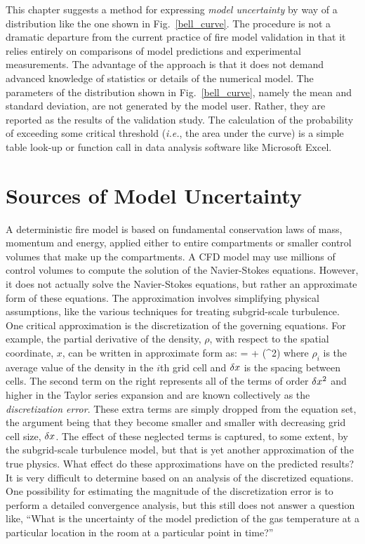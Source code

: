 This chapter suggests a method for expressing {\em model uncertainty} by way of a distribution like the one shown in Fig.~\ref{bell_curve}. The
procedure is not a dramatic departure from the current practice of fire model validation in that it relies entirely on comparisons of model
predictions and experimental measurements. The advantage of the approach is that it does not demand advanced knowledge of statistics or details of
the numerical model. The parameters of the distribution shown in Fig.~\ref{bell_curve}, namely the mean and standard deviation, are not generated by
the model user. Rather, they are reported as the results of the validation study. The calculation of the probability of exceeding some critical
threshold ({\em i.e.}, the area under the curve) is a simple table look-up or function call in data analysis software like Microsoft
Excel\textregistered.



\section{Sources of Model Uncertainty}

A deterministic fire model is based on fundamental conservation laws of mass, momentum and energy,
applied either to entire compartments or smaller control
volumes that make up the compartments. A CFD model may use millions of control volumes to compute the
solution of the Navier-Stokes equations.
However, it does not actually solve the Navier-Stokes equations, but rather an approximate form of these equations.
The approximation involves simplifying
physical assumptions, like the various techniques for treating subgrid-scale turbulence.
One critical approximation is the discretization of the governing equations. For example,
the partial derivative of the density, $\rho$,
with respect to the spatial coordinate, $x$, can be written in approximate form as:
\be {} =  + (\dx^2) \ee
where $\rho_i$ is the average value of the density in the $i$th grid cell and $\delta x$ is the spacing between cells.
The second term on the right represents all of the terms of order $\delta x^2$ and higher in the Taylor
series expansion and are known collectively as the
{\em discretization error}. These extra terms are simply dropped from
the equation set, the argument being that they become smaller and smaller with decreasing grid cell size, $\delta x$.
The effect of these neglected terms is captured, to
some extent, by the subgrid-scale turbulence model, but that is yet another approximation of the true physics.
What effect do these approximations have on
the predicted results? It is very difficult to determine based on an analysis of the discretized equations.
One possibility for estimating
the magnitude of the discretization error is to perform a detailed
convergence analysis, but this still does not answer a
question like, ``What is the uncertainty of the model prediction of the gas
temperature at a particular location in the room at a particular point in time?''

